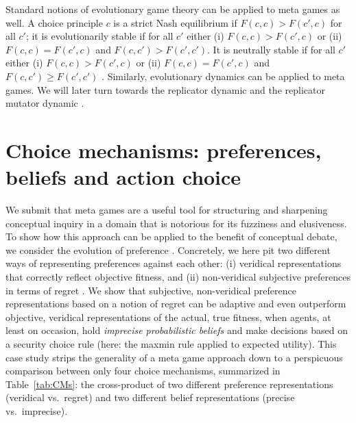\documentclass[fleqn,reqno,11pt]{article}
\begin{document}
Standard notions of evolutionary game theory can be applied to meta games as well. A choice
principle $c$ is a strict Nash equilibrium if $F(c,c) > F(c',c)$ for all $c'$; it is
evolutionarily stable if for all $c'$ either (i) $F(c,c) > F(c',c)$ or (ii) $F(c,c) = F(c',c)$
and $F(c,c') > F(c',c')$. It is neutrally stable if for all $c'$ either (i) $F(c,c) > F(c',c)$
or (ii) $F(c,c) = F(c',c)$ and $F(c,c') \ge F(c',c')$
\citep{Maynard-Smith1982:Evolution-and-t}. Similarly, evolutionary dynamics can be applied to
meta games. We will later turn towards the replicator dynamic
\citep{TaylorJonker1978:Evolutionary-St} and the replicator mutator dynamic
\citep[e.g.][]{Nowak2006:Evolutionary-Dy}.




\section{Choice mechanisms: preferences, beliefs and action choice}
\label{sec:basic-notions}

We submit that meta games are a useful tool for structuring and sharpening conceptual inquiry
in a domain that is notorious for its fuzziness and elusiveness. To show how this approach can
be applied to the benefit of conceptual debate, we consider the evolution of preference
\citep[e.g.,][]{algweib13,DekElyYlan07,RobSam11}. Concretely, we here pit two different ways of
representing preferences against each other: (i) veridical representations that correctly
reflect objective fitness, and (ii) non-veridical subjective preferences in terms of regret
\citep[e.g.,][]{Savage1951:The-theory-of-s,}. We show that subjective, non-veridical preference
representations based on a notion of regret can be adaptive and even outperform objective,
veridical representations of the actual, true fitness, when agents, at least on occasion, hold
\emph{imprecise probabilistic beliefs} \citep[e.g.,][]{gilsch89,levi74,gardsah82} and make
decisions based on a security choice rule (here: the maxmin rule applied to expected
utility). This case study strips the generality of a meta game approach down to a perspicuous
comparison between only four choice mechanisms, summarized in Table~\ref{tab:CMs}: the
cross-product of two different preference representations (veridical vs.~regret) and two
different belief representations (precise vs.~imprecise). 
\end{document}
